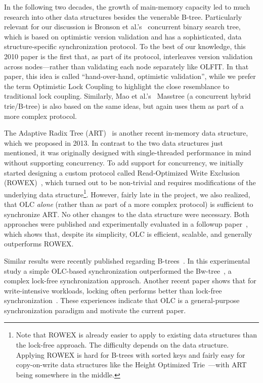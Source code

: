 \documentclass[11pt]{article}
\begin{document}
In the following two decades, the growth of main-memory capacity led to much research into other data structures besides the venerable B-tree.
Particularly relevant for our discussion is Bronson et al.'s~\cite{DBLP:conf/ppopp/BronsonCCO10} concurrent binary search tree, which is based on optimistic version validation and has a sophisticated, data structure-specific synchronization protocol.
To the best of our knowledge, this 2010 paper is the first that, as part of its protocol, interleaves version validation across nodes---rather than validating each node separately like OLFIT.
In that paper, this idea is called ``hand-over-hand, optimistic validation'', while we prefer the term Optimistic Lock Coupling to highlight the close resemblance to traditional lock coupling.
Similarly, Mao et al.'s~\cite{DBLP:dblp_conf/eurosys/MaoKM12} Masstree (a concurrent hybrid trie/B-tree) is also based on the same ideas, but again uses them as part of a more complex protocol.

The Adaptive Radix Tree (ART)~\cite{art} is another recent in-memory data structure, which we proposed in 2013.
In contrast to the two data structures just mentioned, it was originally designed with single-threaded performance in mind without supporting concurrency.
To add support for concurrency, we initially started designing a custom protocol called Read-Optimized Write Exclusion (ROWEX)~\cite{artsync}, which turned out to be non-trivial and requires modifications of the underlying data structure\footnote{Note that ROWEX is already easier to apply to existing data structures than the lock-free approach. The difficulty depends on the data structure. Applying ROWEX is hard for B-trees with sorted keys and fairly easy for copy-on-write data structures like the Height Optimized Trie~\cite{hot}---with ART being somewhere in the middle.}.
However, fairly late in the project, we also realized, that OLC {\em alone} (rather than as part of a more complex protocol) is sufficient to synchronize ART.
No other changes to the data structure were necessary.
Both approaches were published and experimentally evaluated in a followup paper~\cite{artsync}, which shows that, despite its simplicity, OLC is efficient, scalable, and generally outperforms ROWEX.

Similar results were recently published regarding B-trees~\cite{buzzword}.
In this experimental study a simple OLC-based synchronization outperformed the Bw-tree~\cite{DBLP:conf/icde/LevandoskiLS13a}, a complex lock-free synchronization approach.
Another recent paper shows that for write-intensive workloads, locking often performs better than lock-free synchronization~\cite{DBLP:conf/cidr/FaleiroA17}.
These experiences indicate that OLC is a general-purpose synchronization paradigm and motivate the current paper.
\end{document}

